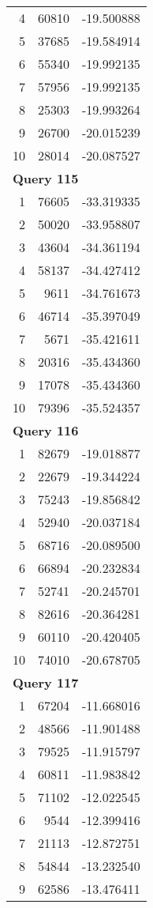 \begin{longtable}[{p}]{@{}rrp{}@{}}
4 & 60810 & -19.500888 \\
5 & 37685 & -19.584914 \\
6 & 55340 & -19.992135 \\
7 & 57956 & -19.992135 \\
8 & 25303 & -19.993264 \\
9 & 26700 & -20.015239 \\
10 & 28014 & -20.087527 \\
\midrule
\multicolumn{3}{l}{\bfseries Query 115} \\
1 & 76605 & -33.319335 \\
2 & 50020 & -33.958807 \\
3 & 43604 & -34.361194 \\
4 & 58137 & -34.427412 \\
5 & 9611 & -34.761673 \\
6 & 46714 & -35.397049 \\
7 & 5671 & -35.421611 \\
8 & 20316 & -35.434360 \\
9 & 17078 & -35.434360 \\
10 & 79396 & -35.524357 \\
\midrule
\multicolumn{3}{l}{\bfseries Query 116} \\
1 & 82679 & -19.018877 \\
2 & 22679 & -19.344224 \\
3 & 75243 & -19.856842 \\
4 & 52940 & -20.037184 \\
5 & 68716 & -20.089500 \\
6 & 66894 & -20.232834 \\
7 & 52741 & -20.245701 \\
8 & 82616 & -20.364281 \\
9 & 60110 & -20.420405 \\
10 & 74010 & -20.678705 \\
\midrule
\multicolumn{3}{l}{\bfseries Query 117} \\
1 & 67204 & -11.668016 \\
2 & 48566 & -11.901488 \\
3 & 79525 & -11.915797 \\
4 & 60811 & -11.983842 \\
5 & 71102 & -12.022545 \\
6 & 9544 & -12.399416 \\
7 & 21113 & -12.872751 \\
8 & 54844 & -13.232540 \\
9 & 62586 & -13.476411 \\

\end{longtable}
